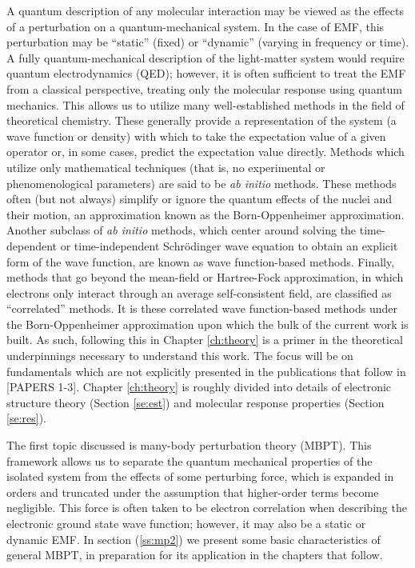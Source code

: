 A quantum description of any molecular interaction may be viewed as
the effects of a perturbation on a quantum-mechanical system. In the
case of EMF, this perturbation may be ``static'' (fixed) or ``dynamic''
(varying in frequency or time). A fully quantum-mechanical description
of the light-matter system would require quantum electrodynamics (QED);
however, it is often sufficient to treat the EMF from a classical
perspective, treating only the molecular response using quantum
mechanics.\cite{Barron2004,Helgaker2012} This allows us to utilize many
well-established methods in the field of theoretical chemistry. These
generally provide a representation of the system (a wave function or density)
with which to take the expectation value of a given operator or, in some
cases, predict the expectation value directly.\cite{Szabo1996} Methods
which utilize only mathematical techniques (that is, no experimental
or phenomenological parameters) are said to be \textit{ab initio}
methods. These methods often (but not always) simplify or ignore the
quantum effects of the nuclei and their motion, an approximation known as
the Born-Oppenheimer approximation.\cite{born1927zur} Another subclass of
\textit{ab initio} methods, which center around solving the time-dependent
or time-independent Schr\"odinger wave equation to obtain an explicit form
of the wave function, are known as wave function-based methods. Finally,
methods that go beyond the mean-field or Hartree-Fock approximation, in
which electrons only interact through an average self-consistent field,
are classified as ``correlated'' methods.  It is these correlated wave
function-based methods under the Born-Oppenheimer approximation upon which
the bulk of the current work is built. As such, following this in Chapter
\ref{ch:theory} is a primer in the theoretical underpinnings necessary to
understand this work.
The focus will be on fundamentals which are not explicitly presented in the
publications that follow in [PAPERS 1-3]. Chapter \ref{ch:theory} is roughly
divided into details of electronic structure theory (Section \ref{se:est})
and molecular response properties (Section \ref{se:res}).

The first topic discussed is many-body perturbation theory
(MBPT).\cite{Bartlett2009} This framework allows us to separate the quantum
mechanical properties of the isolated system from the effects of some perturbing
force, which is expanded in orders and truncated under the assumption
that higher-order terms become negligible.  This force is often taken to
be electron correlation when describing the electronic ground state wave
function;\cite{Moller1934} however, it may also be a static or dynamic
EMF. In section (\ref{ss:mp2}) we present some basic characteristics of
general MBPT, in preparation for its application in the chapters that follow.

